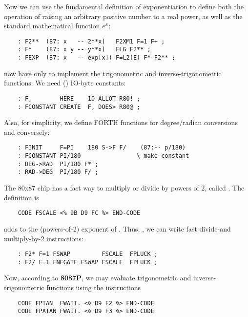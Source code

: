 Now we can use the fundamental definition of exponentiation to define both the operation of raising an arbitrary positive number to a real power, as well as the standard mathematical function $e^x$:

\begin{lstlisting}
    : F2**  (87: x   -- 2**x)   F2XM1 F=1 F+ ;
    : F*    (87: x y -- y**x)   FLG F2** ;
    : FEXP  (87: x   -- exp[x]) F=L2(E) F* F2** ;
\end{lstlisting}

 now have only to implement the trigonometric and inverse-trigonometric functions. We need () IO-byte constants:

\begin{lstlisting}
    : F,        HERE    10 ALLOT R80! ;
    : FCONSTANT CREATE  F, DOES> R80@ ;
\end{lstlisting}

Also, for simplicity, we define FORTH functions for degree/radian conversions and conversely:

\begin{lstlisting}
    : FINIT     F=PI    180 S->F F/    (87:-- p/180)
    : FCONSTANT PI/180                \ make constant
    : DEG->RAD  PI/180 F* ;
    : RAD->DEG  PI/180 F/ ;
\end{lstlisting}


The 80x87 chip has a fast way to multiply or divide by powers of 2, called . The  definition is

\begin{lstlisting}
    CODE FSCALE <% 9B D9 FC %> END-CODE
\end{lstlisting}

 adds  to the (powers-of-2) exponent of . Thus, \eg, we can write fast divide-and multiply-by-2 instructions:

\begin{lstlisting}
    : F2* F=1 FSWAP         FSCALE  FPLUCK ;
    : F2/ F=1 FNEGATE FSWAP FSCALE  FPLUCK ;
\end{lstlisting}

Now, according to \textbf{8087P}, we may evaluate trigonometric and inverse-trigonometric functions using the instructions

\begin{lstlisting}
    CODE FPTAN  FWAIT. <% D9 F2 %> END-CODE
    CODE FPATAN FWAIT. <% D9 F3 %> END-CODE
\end{lstlisting}

